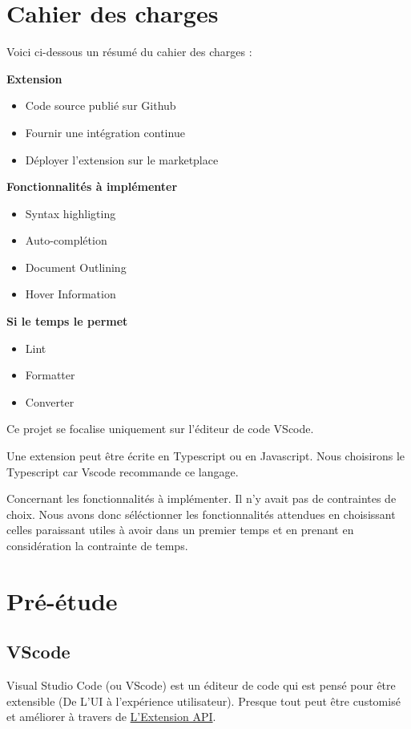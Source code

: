 \documentclass[
    iict, %
    il, %
]{heig-tb}
\begin{document}
\let\cleardoublepage\clearpage

\chapter{Cahier des charges}
Voici ci-dessous un résumé du cahier des charges :

\textbf{Extension}
\begin{itemize}
    \item Code source publié sur Github
    \item Fournir une intégration continue
    \item Déployer l'extension sur le marketplace
\end{itemize}

\textbf{Fonctionnalités à implémenter}
\begin{itemize}
    \item Syntax highligting
    \item Auto-complétion
    \item Document Outlining
    \item Hover Information
\end{itemize}

\textbf{Si le temps le permet}
\begin{itemize}
    \item Lint
    \item Formatter
    \item Converter
\end{itemize}

\vspace{\parskip}

Ce projet se focalise uniquement sur l'éditeur de code VScode.

Une extension peut être écrite en Typescript ou en Javascript.
Nous choisirons le Typescript car Vscode recommande ce langage.

Concernant les fonctionnalités à implémenter. Il n'y avait pas de contraintes de choix.
Nous avons donc séléctionner les fonctionnalités attendues en choisissant celles paraissant utiles à avoir dans un premier temps et en prenant en considération la contrainte de temps.

\chapter{Pré-étude}

\section{VScode}
Visual Studio Code (ou VScode) est un éditeur de code qui est pensé pour être extensible (De L'UI à l'expérience utilisateur).
Presque tout peut être customisé et améliorer à travers de \href{https://code.visualstudio.com/api/extension-capabilities/overview}{L'Extension API}.
\end{document}
